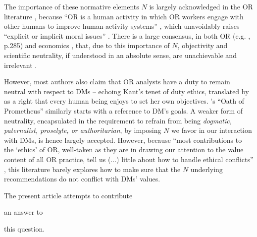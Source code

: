\documentclass[preprint, french, english, 11pt, authoryear]{elsarticle}%
\newcommand{\possessivecite}[1]{\citeauthor{#1}’s \citeyearpar{#1}}
\begin{document}
\begin{changebar}
The importance of these normative elements $N$ is largely acknowledged in the \ac{OR} literature \citep{churchman_operations_1970,taket_undercover_1994,brans_ethics_2007,picavet_opportunities_2009}, 
because ``\ac{OR} is a human activity in which \ac{OR} workers engage with other humans to improve human-activity systems'' \citep{ormerod_operational_2013}, which unavoidably raises ``explicit or implicit moral issues'' \citep{diekmann_moral_2013}. 
There is a large consensus, in both \ac{OR} (e.g. \citet{williams_2009}, p.285) and economics \citep{dwyer_scientific_1985, heath_value_1994, sen_rationality_2004, mongin_value_2006, baujard_value_2013},
that, due to this importance of $N$, objectivity and scientific neutrality, if understood in an absolute sense, are unachievable and irrelevant \citep{le_menestrel_ethics_2004,reisach_creation_2016}. 

However, most authors also claim that \ac{OR} analysts have a duty to remain neutral with respect to \acp{DM} 
-- echoing Kant’s tenet of duty ethics, translated by \citet{reisach_creation_2016} as a right that every human being enjoys to set her own objectives.
\possessivecite{gass_ethical_2009} ``Oath of Prometheus'' similarly starts with a reference to \ac{DM}’s goals.
A weaker form of neutrality, encapsulated in the requirement to refrain from being \emph{dogmatic, paternalist, proselyte, or authoritarian}, by imposing $N$ we favor in our interaction with \acp{DM}, is hence largely accepted.
However, because ``most contributions to the ‘ethics’ of \ac{OR}, well-taken as they are in drawing our attention to the value content of all \ac{OR} practice, tell us (...) little about how to handle ethical conflicts'' \citep{ormerod_operational_2013},
this literature barely explores how to make sure that the $N$ underlying recommendations do not conflict with \acp{DM}' values.\end{changebar}
The present article attempts to contribute \begin{changebar} an answer to\end{changebar} this question.
\end{document}
